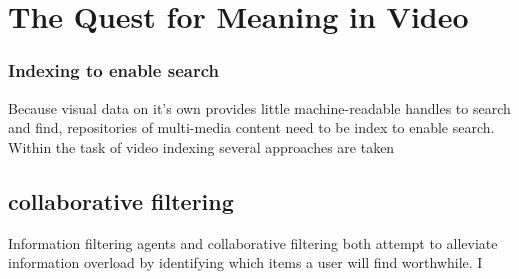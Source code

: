 \chapter{The Quest for Meaning in Video}
\label{chap:quest}



\subsection{Indexing to enable search}
Because visual data on it's own provides little machine-readable handles to search and find, repositories of multi-media content need to be index to enable search. Within the task of video indexing several approaches are taken 


\section{collaborative filtering}
Information filtering agents and collaborative filtering both
attempt to alleviate information overload by identifying
which items a user will find worthwhile.  I